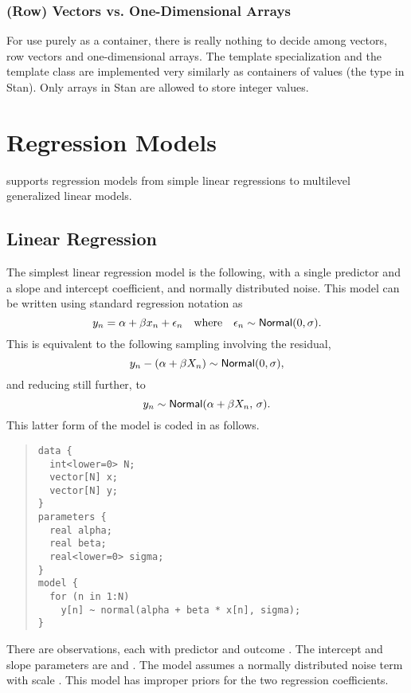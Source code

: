 \subsection{(Row) Vectors vs. One-Dimensional Arrays}

For use purely as a container, there is really nothing to decide among
vectors, row vectors and one-dimensional arrays.  The
 template specialization and the
 template class are implemented very similarly as
containers of  values (the type  in Stan).
Only arrays in Stan are allowed to store integer values.



\chapter{Regression Models}

\noindent
\Stan supports regression models from simple linear regressions to
multilevel generalized linear models.  

\section{Linear Regression}

The simplest linear regression model is the following, with a single
predictor and a slope and intercept coefficient, and normally
distributed noise.  This model can be written using standard
regression notation as
%
\[
y_n = \alpha + \beta x_n + \epsilon_n
\ \ \ \mbox{where} \ \ \ 
\epsilon_n \sim \distro{Normal}(0,\sigma).
\]
This is equivalent to the following sampling involving the
residual,
\[
y_n - (\alpha + \beta X_n) \sim \mbox{\sf Normal}(0,\sigma),
\]
and reducing still further, to
\[
y_n \sim \mbox{\sf Normal}(\alpha + \beta X_n, \, \sigma).
\]
%
This latter form of the model is coded in \Stan as follows.
%
\begin{quote}
\begin{Verbatim}[fontsize=\small]
data {
  int<lower=0> N;
  vector[N] x;
  vector[N] y;
}
parameters {
  real alpha;
  real beta;
  real<lower=0> sigma;
}
model {
  for (n in 1:N)
    y[n] ~ normal(alpha + beta * x[n], sigma);
}
\end{Verbatim}
\end{quote}
%
There are  observations, each with predictor  and
outcome \code{y[n]}.  The intercept and slope parameters are
 and .  The model assumes a normally
distributed noise term with scale .  This model has
improper priors for the two regression coefficients.

